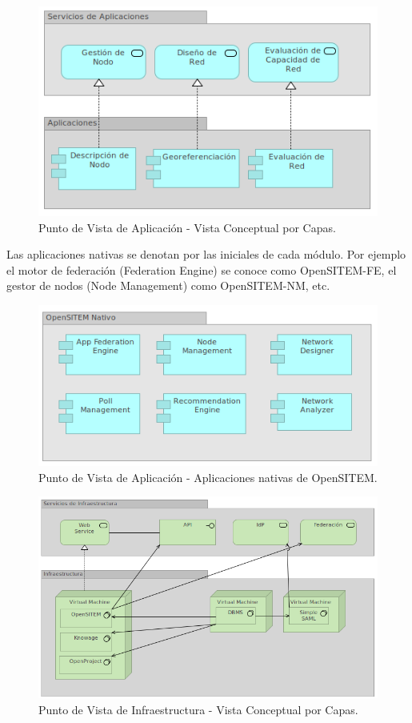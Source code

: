 \begin{figure}
 \centering
 \includegraphics[width=120mm]{punto_aplicacion.png}
 \caption{Punto de Vista de Aplicación - Vista Conceptual por Capas.}
 \label{punto_aplicacion}
\end{figure}

Las aplicaciones nativas se denotan por las iniciales de cada módulo. Por ejemplo el motor de federación (Federation Engine) se conoce como OpenSITEM-FE, el gestor de nodos (Node Management) como OpenSITEM-NM, etc.

\begin{figure}
 \centering
 \includegraphics[width=120mm]{opensitem_nativo.png}
 \caption{Punto de Vista de Aplicación - Aplicaciones nativas de OpenSITEM.}
 \label{punto_aplicacion}
\end{figure}


\begin{figure}
 \centering
 \includegraphics[width=120mm]{punto_infraestructura.png}
 \caption{Punto de Vista de Infraestructura - Vista Conceptual por Capas.}
 \label{punto_infraestructura}
\end{figure}


